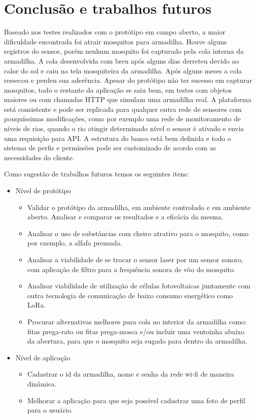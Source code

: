 \documentclass[
	12pt,				%
	openright,			%
	oneside,			%
	a4paper,			%
	chapter=TITLE,		%
	english,			%
	brazil				%
	]{abntex2}
\begin{document}
\chapter{Conclusão e trabalhos futuros}

Baseado nos testes realizados com o protótipo em campo aberto, a maior dificuldade encontrada foi atrair mosquitos para armadilha. Houve alguns registros do  sensor, porém nenhum mosquito foi capturado 
pela cola interna da armadilha. A cola desenvolvida com breu após alguns dias derreteu devido ao calor do sol e caiu na tela mosquiteira da armadilha. Após alguns meses a cola ressecou e 
perdeu sua aderência. Apesar do protótipo não ter sucesso em capturar mosquitos, todo o restante da aplicação se saiu bem, em testes com objetos maiores ou com chamadas HTTP 
que simulam uma armadilha real. A plataforma está consistente e pode ser replicada para qualquer outra rede de sensores com pouquíssimas modificações, como por exemplo uma rede
de monitoramento de níveis de rios, quando o rio atingir determinado nível o sensor é ativado e envia uma requisição para API. A estrutura do banco está bem definida 
e todo o sistema de perfis e permissões pode ser customizado de acordo com as necessidades do cliente.

Como sugestão de trabalhos futuros temos os seguintes itens: 

\begin{itemize}
    \item Nível de protótipo
    \begin{itemize}
        \item Validar o protótipo da armadilha, em ambiente controlado e em ambiente aberto. Analisar e comparar os resultados e a eficácia da mesma.
        \item Analisar o uso de substâncias com cheiro atrativo para o mosquito, como por exemplo, a alfafa prensada.
        \item Analisar a viabilidade de se trocar o sensor laser por um sensor sonoro, com aplicação de filtro para a frequência sonora de vôo do mosquito.
        \item Analisar viabilidade de utilização de células fotovoltaicas juntamente com outra tecnologia de comunicação de baixo consumo energético como LoRa. 
        \item Procurar alternativas melhores para cola no interior da armadilha como: fitas prega-rato ou fitas prega-mosca e/ou incluir uma 
        ventoinha abaixo da abertura, para que o mosquito seja sugado para dentro da armadilha.
    \end{itemize}
    \item Nível de aplicação
    \begin{itemize}
        \item Cadastrar o id da armadilha, nome e senha da rede wi-fi de maneira dinâmica.
        \item Melhorar a aplicação para que seja possível cadastrar uma foto de perfil para o usuário.
    \end{itemize}   
\end{itemize}
\end{document}
